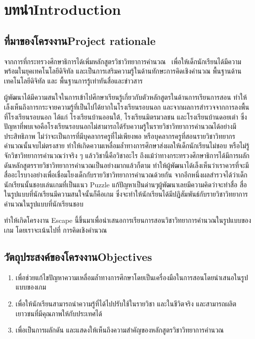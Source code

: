 \chapter{\ifcpe บทนำ\else Introduction\fi}

\section{\ifcpe ที่มาของโครงงาน\else Project rationale\fi}
จากการที่กระทรวงศึกษาธิการได้เพิ่มหลักสูตรวิชาวิทยาการคำนวณ~\cite{cpc} 
เพื่อให้เด็กนักเรียนได้มีความพร้อมในยุคเทคโนโลยีดิจิทัล 
และเป็นการเสริมความรู้ในด้านทักษะการคิดเชิงคำนวณ 
พื้นฐานด้านเทคโนโลยีดิจิทัล และ พื้นฐานการรู้เท่าทันสื่อและข่าวสาร\par
ผู้พัฒนาได้มีความสนใจในการเข้าไปศึกษาเรียนรู้เกี่ยวกับตัวหลักสูตรในด้านการเรียนการสอน
ทำให้เล็งเห็นถึงการกระจายความรู้ที่เป็นไปได้ยากในโรงเรียนรอบนอก และจากผลการสำรวจจากการลงพื้นที่โรงเรียนรอบนอก
 ได้แก่ โรงเรียนบ้านออนใต้, โรงเรียนมิตรมวลชน และโรงเรียนบ้านดอยเต่า
ซึ่งปัญหาที่พบเจอคือโรงเรียนรอบนอกไม่สามารถได้รับความรู้ในรายวิชาวิทยาการคำนวณได้อย่างมีประสิทธิภาพ 
ไม่ว่าจะเป็นการที่มีบุคลากรครูที่ไม่เพียงพอ หรือบุคลากรครูที่สอนรายวิชาวิทยากรคำนวณนั้นจบไม่ตรงสาย 
ทำให้เกิดความเหลื่อมล้ำทางการศึกษาส่งผลให้เด็กนักเรียนไม่ชอบ หรือไม่รู้จักวิชาวิทยาการคำนวณว่าจริง ๆ 
แล้ววิชานี้คือวิชาอะไร ถึงแม้ว่าทางกระทรวงศึกษาธิการได้มีการผลักดันหลักสูตรรายวิชาวิทยาการคำนวณเป็นอย่างมากแล้วก็ตาม
ทำให้ผู้พัฒนาได้เล็งเห็นว่าเราควรที่จะมีสื่ออะไรบางอย่างเพื่อเชื่อมโยงเด็กกับรายวิชาวิทยาการคำนวณด้วยกัน
จากอีกหนึ่งผลสำรวจได้ว่าเด็กนักเรียนนั้นชอบเล่นเกมที่เป็นแนว Puzzle แก้ปัญหาเป็นด่านๆผู้พัฒนาเลยมีความคิดว่าจะทำสื่อ
สื่อในรูปแบบที่นักเรียนมีความสนใจนั้นก็คือเกม ซึ่งจะทำให้นักเรียนได้มีปฏิสัมพันธ์กับรายวิชาวิทยาการคำนวณในรูปแบบที่นักเรียนชอบ\par
ทำให้เกิดโครงงาน Escape นี้ขึ้นมาเพื่อนำเสนอการเรียนการสอนวิชาวิทยาการคำนวณในรูปแบบของเกม
โดยเราจะเน้นไปที่ การคิดเชิงคำนวณ

\section{\ifcpe วัตถุประสงค์ของโครงงาน\else Objectives\fi}
\begin{enumerate}
    \item เพื่อช่วยแก้ไขปัญหาความเหลื่อมล้ำทางการศึกษาโดยเป็นเครื่องมือในการสอนโดยนำเสนอในรูปแบบของเกม
    \item เพื่อให้นักเรียนสามารถนำความรู้ที่ได้ไปปรับใช้ในรายวิชา และในชีวิตจริง และสามารถผลิตเยาวชนที่มีคุณภาพให้กับประเทศได้
    \item เพื่อเป็นการผลักดัน และแสดงให้เห็นถึงความสำคัญของหลักสูตรวิชาวิทยาการคำนวณ
\end{enumerate}

